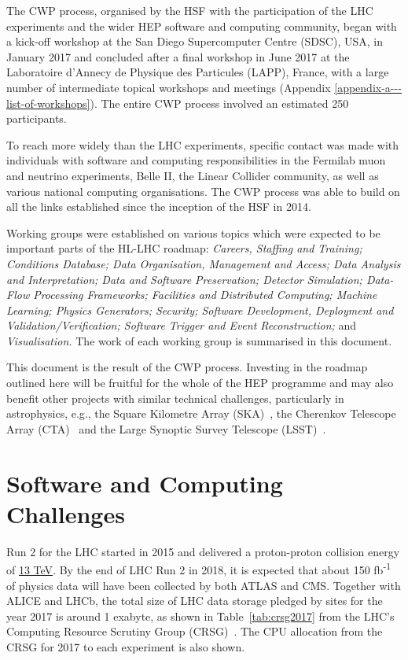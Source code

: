 \documentclass[12pt,a4paper]{article}
\begin{document}
The CWP process, organised by the HSF with the participation of the LHC
experiments and the wider HEP software and computing community, began
with a kick-off workshop at the San Diego Supercomputer Centre (SDSC),
USA, in January 2017 and concluded after a final workshop in June 2017 at
the Laboratoire d'Annecy de Physique des Particules (LAPP), France, with
a large number of intermediate topical workshops and meetings
(Appendix \ref{appendix-a---list-of-workshops}). The
entire CWP process involved an estimated 250 participants.

To reach more widely than the LHC experiments, specific contact was made
with individuals with software and computing responsibilities in the
Fermilab muon and neutrino experiments, Belle II, the Linear Collider
community, as well as various national computing organisations. The CWP
process was able to build on all the links established since the
inception of the HSF in 2014.

Working groups were established on various topics which were expected to
be important parts of the HL-LHC roadmap: \emph{Careers, Staffing and
Training; Conditions Database; Data Organisation, Management and Access;
Data Analysis and Interpretation; Data and Software Preservation;
Detector Simulation; Data-Flow Processing Frameworks; Facilities and
Distributed Computing; Machine Learning; Physics Generators; Security;
Software Development, Deployment and Validation/Verification; Software
Trigger and Event Reconstruction;} and \emph{Visualisation.} The work of
each working group is summarised in this document.

This document is the result of the CWP process. Investing in the roadmap
outlined here will be fruitful for the whole of the HEP programme and
may also benefit other projects with similar technical challenges,
particularly in astrophysics, e.g., the Square Kilometre Array (SKA)~\cite{SKA},
the Cherenkov Telescope Array (CTA)~\cite{CTA} and the Large Synoptic Survey
Telescope (LSST)~\cite{LSST}.

\hypertarget{software-and-computing-challenges}{%
\section{Software and Computing
Challenges}\label{software-and-computing-challenges}}

Run 2 for the LHC started in 2015 and delivered a proton-proton
collision energy of
\href{http://home.cern/about/engineering/restarting-lhc-why-13-tev}{13
TeV}. By the end of LHC Run 2 in 2018, it is expected that about 150
fb\textsuperscript{-1} of physics data will have been collected by both
ATLAS and CMS. Together with ALICE and LHCb, the total size of LHC data
storage pledged by sites for the year 2017 is around 1 exabyte, as shown
in Table~\ref{tab:crsg2017} from the LHC's Computing Resource Scrutiny Group
(CRSG)~\cite{Lucchesi:2284575}. The CPU allocation from the CRSG for 2017 to each
experiment is also shown.
\end{document}
